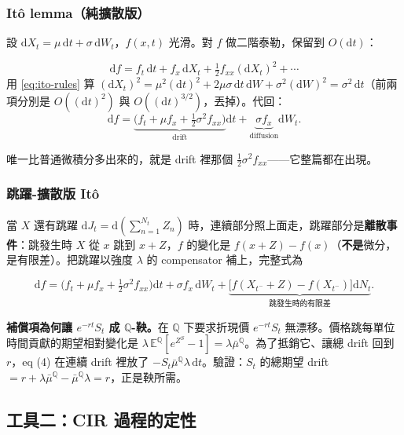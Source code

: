 \documentclass[12pt, a4paper]{article}
\theoremstyle{remark}
\newcommand{\E}{\mathbb{E}}
\newcommand{\Q}{\mathbb{Q}}
\newcommand{\dd}{\mathrm{d}}
\begin{document}
\subsubsection*{Itô lemma（純擴散版）}

設 $\dd X_t = \mu\,\dd t + \sigma\,\dd W_t$，$f(x,t)$ 光滑。對 $f$ 做二階泰勒，保留到 $O(\dd t)$：

\begin{derivbox}
\[
  \dd f = f_t\,\dd t + f_x\,\dd X_t + \tfrac12 f_{xx}(\dd X_t)^2 + \cdots
\]
用 \eqref{eq:ito-rules} 算 $(\dd X_t)^2 = \mu^2(\dd t)^2 + 2\mu\sigma\,\dd t\,\dd W + \sigma^2(\dd W)^2 = \sigma^2\,\dd t$（前兩項分別是 $O((\dd t)^2)$ 與 $O((\dd t)^{3/2})$，丟掉）。代回：
\begin{equation}
  \dd f = \underbrace{\Big(f_t + \mu f_x + \tfrac12\sigma^2 f_{xx}\Big)}_{\text{drift}}\dd t
  + \underbrace{\sigma f_x}_{\text{diffusion}}\dd W_t.
  \tag{$\star$2}\label{eq:ito-lemma}
\end{equation}
\end{derivbox}

唯一比普通微積分多出來的，就是 drift 裡那個 $\frac12\sigma^2 f_{xx}$——它整篇都在出現。

\subsubsection*{跳躍-擴散版 Itô}

當 $X$ 還有跳躍 $\dd J_t = \dd(\sum_{n=1}^{N_t} Z_n)$ 時，連續部分照上面走，跳躍部分是\textbf{離散事件}：跳發生時 $X$ 從 $x$ 跳到 $x+Z$，$f$ 的變化是 $f(x+Z)-f(x)$（\textbf{不是}微分，是有限差）。把跳躍以強度 $\lambda$ 的 compensator 補上，完整式為

\begin{equation}
  \dd f = \Big(f_t + \mu f_x + \tfrac12\sigma^2 f_{xx}\Big)\dd t + \sigma f_x\,\dd W_t
  + \underbrace{\big[f(X_{t^-}+Z)-f(X_{t^-})\big]\dd N_t}_{\text{跳發生時的有限差}}.
  \tag{$\star$3}\label{eq:ito-jump}
\end{equation}

\textbf{補償項為何讓 $e^{-rt}S_t$ 成 $\Q$-鞅。}在 $\Q$ 下要求折現價 $e^{-rt}S_t$ 無漂移。價格跳每單位時間貢獻的期望相對變化是 $\lambda\,\E^\Q[e^{Z^S}-1]=\lambda\bar\mu^\Q$。為了抵銷它、讓總 drift 回到 $r$，eq (4) 在連續 drift 裡放了 $-S_t\bar\mu^\Q\lambda\,\dd t$。驗證：$S_t$ 的總期望 drift $= r + \lambda\bar\mu^\Q - \bar\mu^\Q\lambda = r$，正是鞅所需。

\subsection{工具二：CIR 過程的定性}
\end{document}
